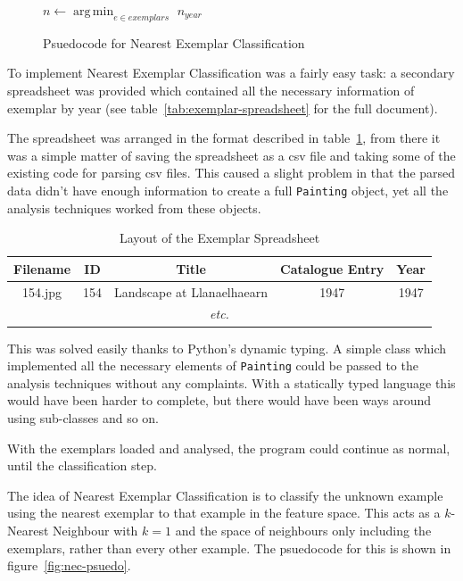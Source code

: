 \begin{figure}[h]
\begin{algorithmic}
\State $n \gets \operatorname*{arg\,min}_{e \in exemplars}$ 
\State \Return $n_{year}$
\EndFunction
\end{algorithmic}
\caption{Psuedocode for Nearest Exemplar Classification}\label{fig:nearest-exemplar}
\end{figure}

To implement Nearest Exemplar Classification was a fairly easy task: a secondary spreadsheet was 
provided which contained all the necessary information of exemplar by year (see 
table~\ref{tab:exemplar-spreadsheet} for the full document).

The spreadsheet was arranged in the format described in table~\ref{tab:exemplar-layout}, from
there it was a simple matter of saving the spreadsheet as a \gls{csv} file and taking some of the
existing code for parsing \gls{csv} files. This caused a slight problem in that the parsed data
didn't have enough information to create a full \texttt{Painting} object, yet all the analysis
techniques worked from these objects.

\begin{table}[h]
\centering
\begin{tabular}{|c|c|c|c|c|} \hline
Filename & ID  & Title                      & Catalogue Entry & Year \\\hline
154.jpg  & 154 & Landscape at Llanaelhaearn & 1947            & 1947 \\\hline
\multicolumn{5}{|c|}{\textit{etc.}}\\\hline
\end{tabular}
\caption{Layout of the Exemplar Spreadsheet}\label{tab:exemplar-layout}
\end{table}

This was solved easily thanks to Python's dynamic typing. A simple class which implemented all the
necessary elements of \texttt{Painting} could be passed to the analysis techniques without any
complaints. With a statically typed language this would have been harder to complete, but there
would have been ways around using sub-classes and so on.

With the exemplars loaded and analysed, the program could continue as normal, until the
classification step.

The idea of Nearest Exemplar Classification is to classify the unknown example using the nearest
exemplar to that example in the feature space. This acts as a $k$-Nearest Neighbour with $k=1$ and
the space of neighbours only including the exemplars, rather than every other example. The 
psuedocode for this is shown in figure~\ref{fig:nec-psuedo}.

